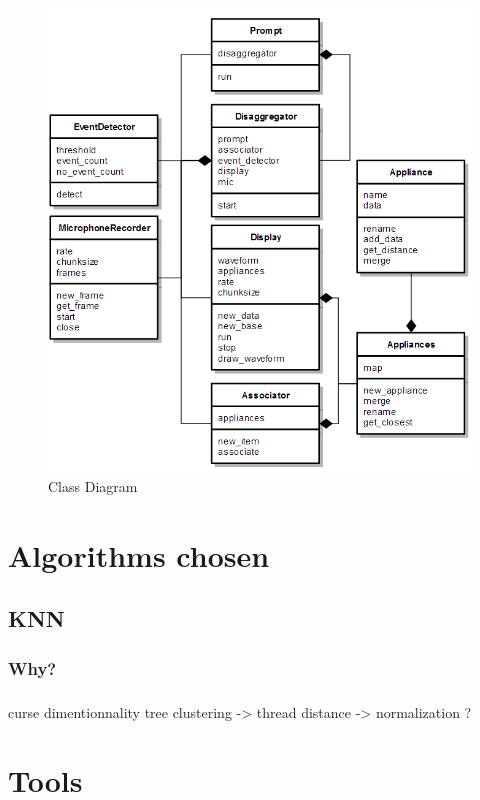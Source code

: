 \begin{figure}
    \centering
    \includegraphics[width=\textwidth]{img/diagram.png}
    \caption{Class Diagram}
    \label{fig:class_diagram}
\end{figure}

\section{Algorithms chosen}
\subsection{KNN}
\subsubsection{Why?}

\subsubsection{}
curse dimentionnality
tree
clustering -> thread
distance -> normalization ?
\section{Tools}